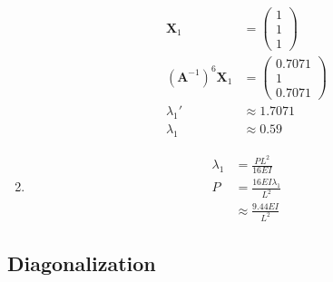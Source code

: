 \documentclass{article}
\begin{document}
\begin{enumerate}
        \begin{align*}
          \mathbf{X}_1                     & = \begin{pmatrix}
                                                 1 \\
                                                 1 \\
                                                 1
                                               \end{pmatrix} \\
          (\mathbf{A}^{-1})^6 \mathbf{X}_1 & = \begin{pmatrix}
                                                 0.7071 \\
                                                 1      \\
                                                 0.7071
                                               \end{pmatrix} \\
          \lambda_1'                       & \approx 1.7071   \\
          \lambda_1                        & \approx 0.59
        \end{align*}

  \item

        \begin{align*}
          \lambda_1 & = \frac{P L^2}{16 E I}         \\
          P         & = \frac{16 E I \lambda_1}{L^2} \\
                    & \approx \frac{9.44 E I}{L^2}
        \end{align*}
\end{enumerate}

\subsection{Diagonalization}

\subsubsection{}
\end{document}
